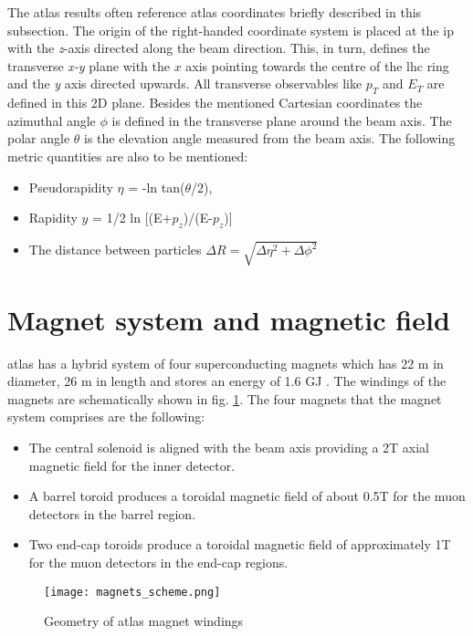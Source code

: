		The \gls{atlas} results often reference \gls{atlas} coordinates briefly described in this subsection. The origin of the right-handed coordinate system is placed at the \gls{ip} with the \textit{z}-axis directed along the beam direction. This, in turn, defines the transverse \textit{x-y} plane with the $\textit{x}$ axis pointing towards the centre of the \gls{lhc} ring and the \textit{y} axis directed upwards. All transverse observables like $p_T$ and $E_T$ are defined in this 2D plane. Besides the mentioned Cartesian coordinates the azimuthal angle \textit{$\phi$} is defined in the transverse plane around the beam axis. The polar angle \textit{$\theta$} is the elevation angle measured from the beam axis. The following metric quantities are also to be mentioned:
		\begin{itemize}
		\item Pseudorapidity $\eta$ = -ln tan($\theta$/2),
		\item Rapidity $y$ = 1/2 ln [(E+$p_z$)/(E-$p_z$)]
		\item The distance between particles $\Delta R = \sqrt{\Delta \eta^2 + \Delta \phi ^2}$
		\end{itemize}
        
        \section{Magnet system and magnetic field}\label{atlas_magnets}
        \gls{atlas} has a hybrid system of four superconducting magnets which has 22 m in diameter, 26 m in length and stores an energy of 1.6 GJ \cite{magnet_tdr1}. The windings of the magnets are schematically shown in fig. \ref{fig::atlas_magnets}. The four magnets that the magnet system comprises are the following: 
        		\begin{itemize}
        	\item The central solenoid is aligned with the beam axis providing a 2T axial magnetic field for the inner detector.
        	\item A barrel toroid produces a toroidal magnetic field of about 0.5T for the muon detectors in the barrel region.
        	\item Two end-cap toroids produce a toroidal magnetic field of approximately 1T for the muon detectors in the end-cap regions.
        \end{itemize}
        \begin{figure}[htpb]
        	\centering
        	\texttt{[image: magnets\_scheme.png]}
        	\caption{Geometry of \gls{atlas} magnet windings}
        	\label{fig::atlas_magnets}
        \end{figure}
